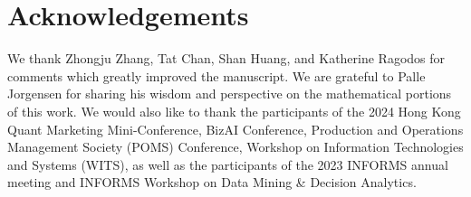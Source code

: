 \documentclass[mnsc,blindrev]{informs3}
\begin{document}
\section*{Acknowledgements}
We thank Zhongju Zhang, Tat Chan, Shan Huang, and Katherine Ragodos for comments which greatly improved the manuscript. We are grateful to Palle Jorgensen for sharing his wisdom and perspective on the mathematical portions of this work. We would also like to thank the participants of the 2024 Hong Kong Quant Marketing Mini-Conference, BizAI Conference, Production and Operations Management Society (POMS) Conference, Workshop on Information Technologies and Systems (WITS), as well as the participants of the 2023 INFORMS annual meeting and INFORMS Workshop on Data Mining \& Decision Analytics.









\newpage
\end{document}
